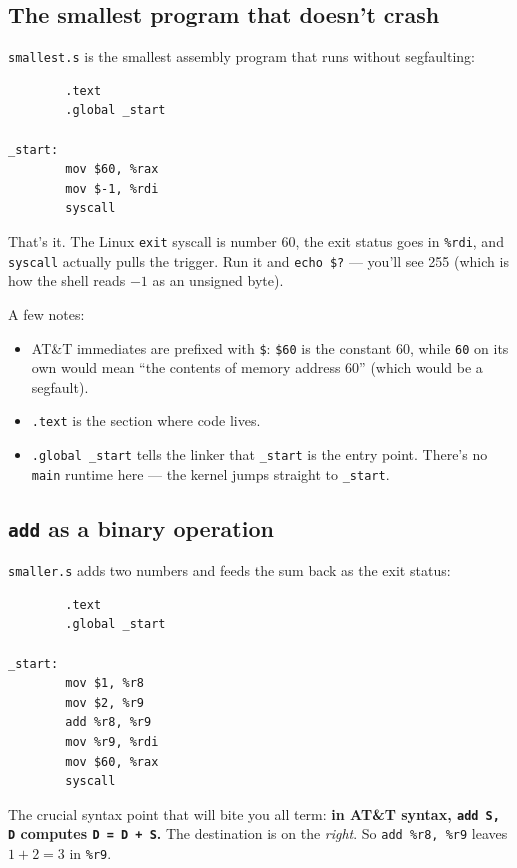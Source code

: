 \documentclass[11pt]{article}
\begin{document}
\subsection*{The smallest program that doesn't crash}

\texttt{smallest.s} is the smallest assembly program that runs
without segfaulting:

\begin{lstlisting}
        .text
        .global _start

_start:
        mov $60, %rax
        mov $-1, %rdi
        syscall
\end{lstlisting}

That's it. The Linux \texttt{exit} syscall is number 60, the exit
status goes in \texttt{\%rdi}, and \texttt{syscall} actually pulls
the trigger. Run it and \texttt{echo \$?} --- you'll see 255
(which is how the shell reads $-1$ as an unsigned byte).

A few notes:
\begin{itemize}
  \item AT\&T immediates are prefixed with \texttt{\$}: \texttt{\$60}
    is the constant 60, while \texttt{60} on its own would mean
    ``the contents of memory address 60'' (which would be a
    segfault).
  \item \texttt{.text} is the section where code lives.
  \item \texttt{.global \_start} tells the linker that \texttt{\_start}
    is the entry point. There's no \texttt{main} runtime here ---
    the kernel jumps straight to \texttt{\_start}.
\end{itemize}

\subsection*{\texttt{add} as a binary operation}

\texttt{smaller.s} adds two numbers and feeds the sum back as the
exit status:

\begin{lstlisting}
        .text
        .global _start

_start:
        mov $1, %r8
        mov $2, %r9
        add %r8, %r9
        mov %r9, %rdi
        mov $60, %rax
        syscall
\end{lstlisting}

The crucial syntax point that will bite you all term:
\textbf{in AT\&T syntax, \texttt{add S, D} computes \texttt{D = D + S}.}
The destination is on the \emph{right}. So \texttt{add \%r8, \%r9}
leaves $1+2=3$ in \texttt{\%r9}.
\end{document}
